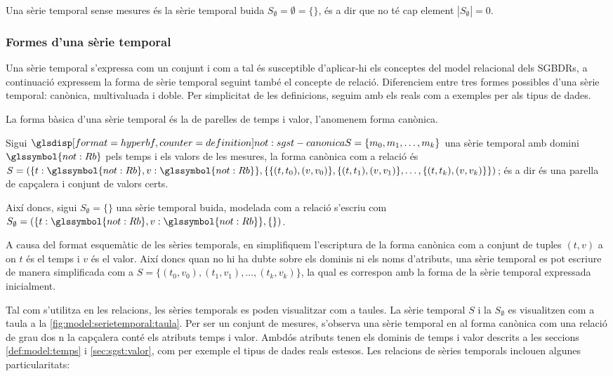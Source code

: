 Una sèrie temporal sense mesures és la sèrie temporal buida
$S_\emptyset= \emptyset = \{\}$, és a dir que no té cap element
$|S_\emptyset|=0$.

 


\subsubsection{Formes d'una sèrie temporal}


Una sèrie temporal s'expressa com un conjunt i com a tal és
susceptible d'aplicar-hi els conceptes del model relacional dels
\glspl{SGBDR}, a continuació
expressem la forma de sèrie temporal seguint també el concepte de
relació. Diferenciem entre tres formes possibles d'una sèrie temporal:
canònica, multivaluada i doble.  Per simplicitat de les definicions,
seguim amb els reals com a exemples per als tipus de dades.


La forma bàsica d'una sèrie temporal és la de parelles de temps i
valor, l'anomenem forma canònica. 
\begin{definition}
  \label{def:sgst:forma-canonica}
  Sigui $\glsdispdef{not:sgst-canonica}{S = \{ m_0, m_1 , \dotsc, m_k
    \}}$ una sèrie temporal amb domini $\glssymbol{not:Rb}$ pels temps
  i els valors de les mesures, la forma canònica com a relació és $S =
  ( \{t: \glssymbol{not:Rb}, v: \glssymbol{not:Rb}\}, \{ \{
  (t,t_0),(v,v_0)\}, \{(t,t_1),(v,v_1)\}, \dotsc, \{(t,t_k),(v,v_k)\}
  \} )$; és a dir és una parella de capçalera i conjunt de valors
  certs.

  Així doncs, sigui $S_{\emptyset} = \{ \}$ una sèrie temporal buida,
  modelada com a relació s'escriu com $S_{\emptyset} = ( \{t:
  \glssymbol{not:Rb}, v: \glssymbol{not:Rb}\}, \{ \} )$.
\end{definition}


A causa del format esquemàtic de les sèries temporals, en simplifiquem
l'escriptura de la forma canònica com a conjunt de tuples $(t,v)$ a on
$t$ és el temps i $v$ és el valor. Així doncs quan no hi ha dubte
sobre els dominis ni els noms d'atributs, una sèrie temporal es pot
escriure de manera simplificada com a $S = \{ (t_0,v_0), (t_1,v_1),
\dotsc, (t_k,v_k) \}$, la qual es correspon amb la forma de la sèrie
temporal expressada inicialment.


Tal com s'utilitza en les relacions, les sèries temporals es poden
visualitzar com a taules. La sèrie temporal $S$ i la $S_{\emptyset}$
es visualitzen com a taula a la
\autoref{fig:model:serietemporal:taula}.
Per ser un conjunt de mesures, s'observa una sèrie temporal en al
forma canònica com una relació de grau dos n la capçalera conté els
atributs temps i valor. Ambdós atributs tenen els dominis de temps i
valor descrits a les seccions \ref{def:model:temps} i
\ref{sec:sgst:valor}, com per exemple el tipus de dades reals
estesos. Les relacions de sèries temporals inclouen algunes
particularitats:


